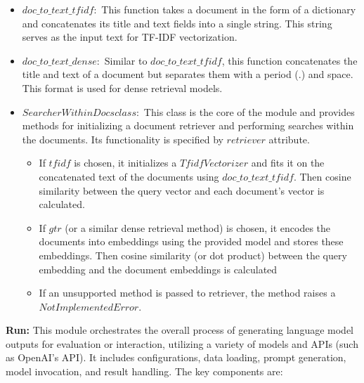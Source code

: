 \begin{itemize}
    \item $doc\_to\_text\_tfidf:$ This function takes a document in the form of a dictionary and concatenates its title and text fields into a single string. This string serves as the input text for TF-IDF vectorization.

    \item $doc\_to\_text\_dense:$ Similar to $doc\_to\_text\_tfidf$, this function concatenates the title and text of a document but separates them with a period (.) and space. This format is used for dense retrieval models.

    \item $SearcherWithinDocs class:$ This class is the core of the module and provides methods for initializing a document retriever and performing searches within the documents. Its functionality is specified by $retriever$ attribute.

    \begin{itemize}
        \item If $tfidf$ is chosen, it initializes a $TfidfVectorizer$ and fits it on the concatenated text of the documents using $doc\_to\_text\_tfidf$. Then cosine similarity between the query vector and each document's vector is calculated.

        \item If $gtr$ (or a similar dense retrieval method) is chosen, it encodes the documents into embeddings using the provided model and stores these embeddings. Then cosine similarity (or dot product) between the query embedding and the document embeddings is calculated

        \item If an unsupported method is passed to retriever, the method raises a $NotImplementedError$.
    \end{itemize}
\end{itemize}

\textbf{Run:} This module orchestrates the overall process of generating language model outputs for evaluation or interaction, utilizing a variety of models and APIs (such as OpenAI's API). It includes configurations, data loading, prompt generation, model invocation, and result handling. The key components are:


